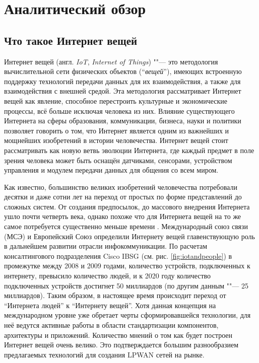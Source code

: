 \chapter{Аналитический обзор}
\label{cha:analysis}
%
%


\section{Что такое Интернет вещей}

Интернет вещей (англ. \textit{IoT}, \textit{Internet of Things}) ""--- это методология вычислительной сети физических объектов (``\textit{вещей}''), имеющих встроенную поддержку технологий передачи данных для их взаимодействия, а также для взаимодействия с внешней средой.
Эта методология рассматривает Интернет вещей как явление, способное перестроить культурные и экономические процессы, всё больше исключая человека из них.
Влияние существующего Интернета на сферы образования, коммуникации, бизнеса, науки и политики позволяет говорить о том, что Интернет является одним из важнейших и мощнейших изобретений в истории человечества\cite{evans2011internet}.
Интернет вещей стоит рассматривать как новую ветвь эволюции Интернета, где каждый предмет в поле зрения человека может быть оснащён датчиками, сенсорами, устройством управления и модулем передачи данных для общения со всем миром.

Как известно, большинство великих изобретений человечества потребовали десятки и даже сотни лет на переход от простых по форме представлений до сложных систем.
От создания предпосылок, до массового внедрения Интернета ушло почти четверть века, однако похоже что для Интернета вещей на то же самое потребуется существенно меньше времени \cite{chernyak2013}.
Международный союз связи (МСЭ) и Европейский Союз определили Интернету вещей главенствующую роль в дальнейшем развитии отрасли инфокоммуникации. 
По расчетам консалтингового подразделения Cisco IBSG (см. рис. \ref{fig:iotandpeople}) в промежутке между 2008 и 2009 годами, количество устройств, подключенных к интернету, превысило количество людей, и к 2020 году количество подключенных устройств достигнет 50 миллиардов\cite{evans2011internet} (по другим данным\cite{denise2014} ""--- 25 миллиардов).
Таким образом, в настоящее время происходит переход от ``Интернета людей'' к ``Интернету вещей''.
Хотя данная концепция на международном уровне уже обретает черты сформировавшейся технологии, для неё ведутся активные работы в области стандартизации компонентов, архитектуры и приложений.
Количество мнений о том как будет построен Интернет вещей очень велико. 
Это подтверждается большим разнообразием предлагаемых технологий для создания LPWAN сетей на рынке.

